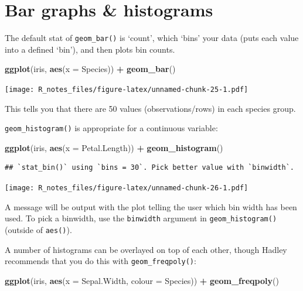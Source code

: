 \documentclass[]{book}
\newenvironment{Shaded}{\begin{snugshade}}{\end{snugshade}}
\newcommand{\KeywordTok}[1]{\textcolor[rgb]{0.13,0.29,0.53}{\textbf{#1}}}
\newcommand{\DataTypeTok}[1]{\textcolor[rgb]{0.13,0.29,0.53}{#1}}
\newcommand{\StringTok}[1]{\textcolor[rgb]{0.31,0.60,0.02}{#1}}
\newcommand{\OperatorTok}[1]{\textcolor[rgb]{0.81,0.36,0.00}{\textbf{#1}}}
\newcommand{\NormalTok}[1]{#1}
\begin{document}
\section{Bar graphs \& histograms}\label{bar-graphs-histograms}

The default stat of \texttt{geom\_bar()} is `count', which `bins' your
data (puts each value into a defined `bin'), and then plots bin counts.

\begin{Shaded}
\begin{Highlighting}[]
\KeywordTok{ggplot}\NormalTok{(iris, }\KeywordTok{aes}\NormalTok{(}\DataTypeTok{x =}\NormalTok{ Species)) }\OperatorTok{+}
\StringTok{  }\KeywordTok{geom_bar}\NormalTok{()}
\end{Highlighting}
\end{Shaded}

\texttt{[image: R\_notes\_files/figure-latex/unnamed-chunk-25-1.pdf]}

This tells you that there are 50 values (observations/rows) in each
species group.

\texttt{geom\_histogram()} is appropriate for a continuous variable:

\begin{Shaded}
\begin{Highlighting}[]
\KeywordTok{ggplot}\NormalTok{(iris, }\KeywordTok{aes}\NormalTok{(}\DataTypeTok{x =}\NormalTok{ Petal.Length)) }\OperatorTok{+}\StringTok{ }
\StringTok{  }\KeywordTok{geom_histogram}\NormalTok{()}
\end{Highlighting}
\end{Shaded}

\begin{verbatim}
## `stat_bin()` using `bins = 30`. Pick better value with `binwidth`.
\end{verbatim}

\texttt{[image: R\_notes\_files/figure-latex/unnamed-chunk-26-1.pdf]}

A message will be output with the plot telling the user which bin width
has been used. To pick a binwidth, use the \texttt{binwidth} argument in
\texttt{geom\_histogram()} (outside of \texttt{aes()}).

A number of histograms can be overlayed on top of each other, though
Hadley recommends that you do this with \texttt{geom\_freqpoly()}:

\begin{Shaded}
\begin{Highlighting}[]
\KeywordTok{ggplot}\NormalTok{(iris, }\KeywordTok{aes}\NormalTok{(}\DataTypeTok{x =}\NormalTok{ Sepal.Width, }\DataTypeTok{colour =}\NormalTok{ Species)) }\OperatorTok{+}\StringTok{ }
\StringTok{  }\KeywordTok{geom_freqpoly}\NormalTok{()}
\end{Highlighting}
\end{Shaded}
\end{document}
